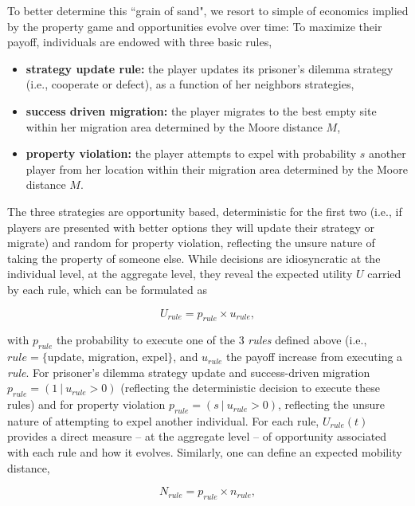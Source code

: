 To better determine this ``grain of sand", we resort to simple of economics implied by the property game and opportunities evolve over time: To maximize their payoff, individuals are endowed with three basic rules, 

\begin{itemize}
  \item {\bf strategy update rule:} the player updates its prisoner's dilemma strategy (i.e., cooperate or defect), as a function of her neighbors strategies,
  \item {\bf success driven migration:} the player migrates to the best empty site within her migration area determined by the Moore distance $M$,
  \item {\bf property violation:} the player attempts to expel with probability $s$ another player from her location within their migration area determined by the Moore distance $M$.
\end{itemize}

The three strategies are opportunity based, deterministic for the first two (i.e., if players are presented with better options they will update their strategy or migrate) and random for property violation, reflecting the unsure nature of taking the property of someone else. While decisions are idiosyncratic at the individual level, at the aggregate level, they reveal the expected utility $U$ carried by each rule, which can be formulated as 

\begin{equation}
U_{rule} = p_{rule} \times u_{rule},
\label{U}
\end{equation}

with $p_{rule}$ the probability to execute one of the 3 {\it rules} defined above (i.e., $rule = \{$update, migration, expel$\}$, and $u_{rule}$ the payoff increase from executing a {\it rule}. For prisoner's dilemma strategy update and success-driven migration $p_{rule} = (1~|~u_{rule} > 0)$ (reflecting the deterministic decision to execute these rules) and for property violation $p_{rule} = (s~|~u_{rule} > 0)$, reflecting the unsure nature of attempting to expel another individual. For each rule, $U_{rule}(t)$ provides a direct measure -- at the aggregate level -- of opportunity associated with each rule and how it evolves. Similarly, one can define an expected mobility distance,

\begin{equation}
N_{rule} = p_{rule} \times n_{rule},
\end{equation}

